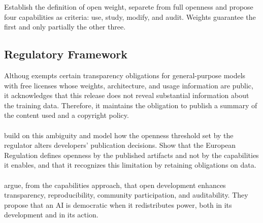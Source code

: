 \documentclass{article}
\begin{document}
Establish the definition of open weight, separete from full openness and propose four capabilities as criteria: use, study, modify, and audit. Weights guarantee the first and only partially the other three.

\subsection{Regulatory Framework}

Althoug \textcite{EU2024_1689} exempts certain transparency obligations for general-purpose models with free licenses whose weights, architecture, and usage information are public, it acknowledges that this release does not reveal substantial information about the training data. Therefore, it maintains the obligation to publish a summary of the content used and a copyright policy. 
\\ \\
\textcite{qiu2026modeling} build on this ambiguity and model how the openness threshold set by the regulator alters developers' publication decisions.
Show that the European Regulation defines openness by the published artifacts and not by the capabilities it enables, and that it recognizes this limitation by retaining obligations on data. 
\\ \\
\textcite{manchanda2026open} argue, from the capabilities approach, that open development enhances transparency, reproducibility, community participation, and auditability. They propose that an AI is democratic when it redistributes power, both in its development and in its action.
\end{document}
